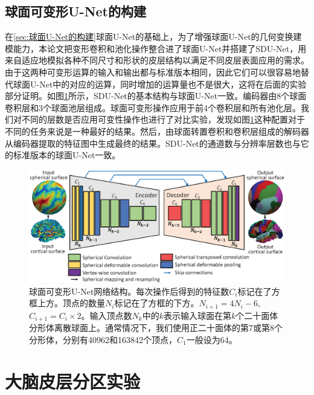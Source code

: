 \subsection{球面可变形U-Net的构建}
在\ref{sec:球面U-Net的构建}球面U-Net的基础上，为了增强球面U-Net的几何变换建模能力，本论文把变形卷积和池化操作整合进了球面U-Net并搭建了SDU-Net，用来自适应地模拟各种不同尺寸和形状的皮层结构以满足不同皮层表面应用的需求。由于这两种可变形运算的输入和输出都与标准版本相同，因此它们可以很容易地替代球面U-Net中的对应的运算，同时增加的运算量也不是很大，这将在后面的实验部分证明。如图\ref{fig:fig_sdunet}所示，SDU-Net的基本结构与球面U-Net一致。编码器由8个球面卷积层和3个球面池层组成。球面可变形操作应用于前4个卷积层和所有池化层。我们对不同的层数是否应用可变性操作也进行了对比实验，发现如图\ref{fig:fig_sdunet}这种配置对于不同的任务来说是一种最好的结果。然后，由球面转置卷积和卷积层组成的解码器从编码器提取的特征图中生成最终的结果。SDU-Net的通道数与分辨率层数也与它的标准版本的球面U-Net一致。

\begin{figure}[t]
	\centering
	\includegraphics[width=0.9\linewidth]{figure/spheircal_deform_cnn}
	\caption{球面可变形U-Net网络结构。每次操作后得到的特征数$C_i$标记在了方框上方。顶点的数量$N_i$标记在了方框的下方。$N_{i+1}=4N_i-6$, $C_{i+1}=C_i\times 2$。输入顶点数$N_k$中的$k$表示输入球面在第$k$个二十面体分形体离散球面上。通常情况下，我们使用正二十面体的第7或第8个分形体，分别有40962和163842个顶点，$C_1$一般设为64。}
	\label{fig:fig_sdunet}
\end{figure}





\section{大脑皮层分区实验}\label{sec:大脑皮层分区实验}
